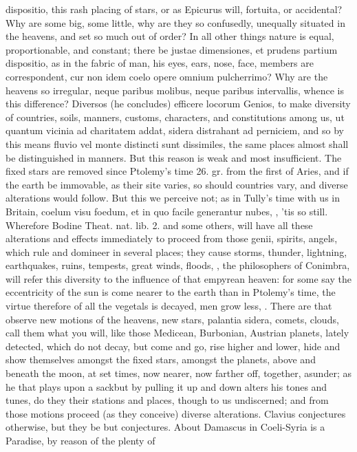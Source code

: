 {dispositio, this rash placing of stars, or as Epicurus will, fortuita,
or accidental? Why are some big, some little, why are they so
confusedly, unequally situated in the heavens, and set so much out of
order? In all other things nature is equal, proportionable, and
constant; there be justae dimensiones, et prudens partium dispositio,
as in the fabric of man, his eyes, ears, nose, face, members are
correspondent, cur non idem coelo opere omnium pulcherrimo? Why are the
heavens so irregular, neque paribus molibus, neque paribus intervallis,
whence is this difference? Diversos (he concludes) efficere locorum
Genios, to make diversity of countries, soils, manners, customs,
characters, and constitutions among us, ut quantum vicinia ad
charitatem addat, sidera distrahant ad perniciem, and so by this means
fluvio vel monte distincti sunt dissimiles, the same places almost
shall be distinguished in manners. But this reason is weak and most
insufficient. The fixed stars are removed since Ptolemy's time 26. gr.
from the first of Aries, and if the earth be immovable, as their site
varies, so should countries vary, and diverse alterations would follow.
But this we perceive not; as in Tully's time with us in Britain, coelum
visu foedum, et in quo facile generantur nubes, \etc{}, 'tis so still.
Wherefore Bodine Theat. nat. lib. 2. and some others, will have all
these alterations and effects immediately to proceed from those genii,
spirits, angels, which rule and domineer in several places; they cause
storms, thunder, lightning, earthquakes, ruins, tempests, great winds,
floods, \etc{}, the philosophers of Conimbra, will refer this diversity to
the influence of that empyrean heaven: for some say the eccentricity of
the sun is come nearer to the earth than in Ptolemy's time, the virtue
therefore of all the vegetals is decayed, men grow less, \etc{}.
There are that observe new motions of the heavens, new stars, palantia
sidera, comets, clouds, call them what you will, like those Medicean,
Burbonian, Austrian planets, lately detected, which do not decay, but
come and go, rise higher and lower, hide and show themselves amongst
the fixed stars, amongst the planets, above and beneath the moon, at
set times, now nearer, now farther off, together, asunder; as he that
plays upon a sackbut by pulling it up and down alters his tones and
tunes, do they their stations and places, though to us undiscerned; and
from those motions proceed (as they conceive) diverse alterations.
Clavius conjectures otherwise, but they be but conjectures. About
Damascus in Coeli-Syria is a Paradise, by reason of the plenty of
}
